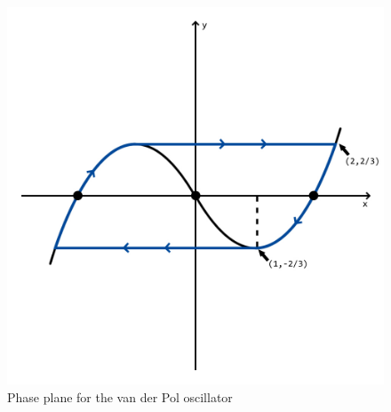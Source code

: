 \documentclass[]{article}
\numberwithin{equation}{section}		%
\begin{document}
\begin{figure}
\caption{Phase plane for the van der Pol oscillator}
\begin{center}
\includegraphics[scale=.25]{figures/van_der_Pol_oscillator.jpg}
\end{center}
\label{fig:vdp}
\end{figure}
\end{document}
